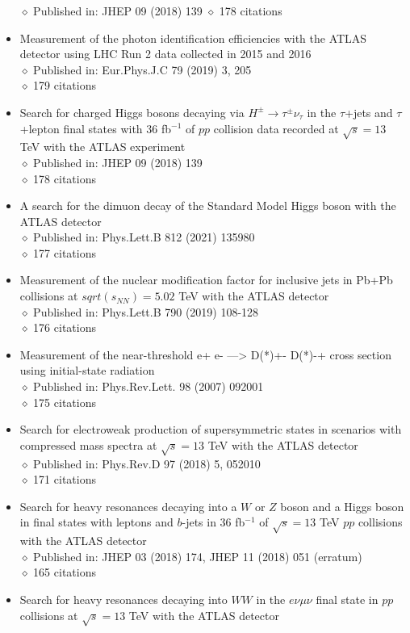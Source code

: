 \documentclass[margin, 10pt]{res} %
\begin{document}
\begin{resume}
\begin{itemize}
$\diamond$ Published in: JHEP 09 (2018) 139
$\diamond$ 178 citations
\item Measurement of the photon identification efficiencies with the ATLAS detector using LHC Run 2 data collected in 2015 and 2016\\
$\diamond$ Published in: Eur.Phys.J.C 79 (2019) 3, 205\\
$\diamond$ 179 citations
\item Search for charged Higgs bosons decaying via $H^{\pm} \rightarrow \tau^{\pm}\nu_{\tau}$ in the $\tau$+jets and $\tau$+lepton final states with 36 fb$^{-1}$ of $pp$ collision data recorded at $\sqrt{s} = 13$ TeV with the ATLAS experiment\\
$\diamond$ Published in: JHEP 09 (2018) 139\\
$\diamond$ 178 citations
\item A search for the dimuon decay of the Standard Model Higgs boson with the ATLAS detector\\
$\diamond$ Published in: Phys.Lett.B 812 (2021) 135980\\
$\diamond$ 177 citations
\item Measurement of the nuclear modification factor for inclusive jets in Pb+Pb collisions at $sqrt(s_{NN}) = 5.02$ TeV with the ATLAS detector\\
$\diamond$ Published in: Phys.Lett.B 790 (2019) 108-128\\
$\diamond$ 176 citations
\item Measurement of the near-threshold e+ e- ---> D(*)+- D(*)-+ cross section using initial-state radiation\\
$\diamond$ Published in: Phys.Rev.Lett. 98 (2007) 092001\\
$\diamond$ 175 citations
\item Search for electroweak production of supersymmetric states in scenarios with compressed mass spectra at $\sqrt{s} = 13$ TeV with the ATLAS detector\\
$\diamond$ Published in: Phys.Rev.D 97 (2018) 5, 052010\\
$\diamond$ 171 citations
\item Search for heavy resonances decaying into a $W$ or $Z$ boson and a Higgs boson in final states with leptons and $b$-jets in 36 fb$^{-1}$ of $\sqrt{s} = 13$ TeV $pp$ collisions with the ATLAS detector\\
$\diamond$ Published in: JHEP 03 (2018) 174, JHEP 11 (2018) 051 (erratum)\\
$\diamond$ 165 citations
\item Search for heavy resonances decaying into $WW$ in the $e\nu\mu\nu$ final state in $pp$ collisions at $\sqrt{s} = 13$ TeV with the ATLAS detector\\

\end{itemize}
\end{resume}
\end{document}
